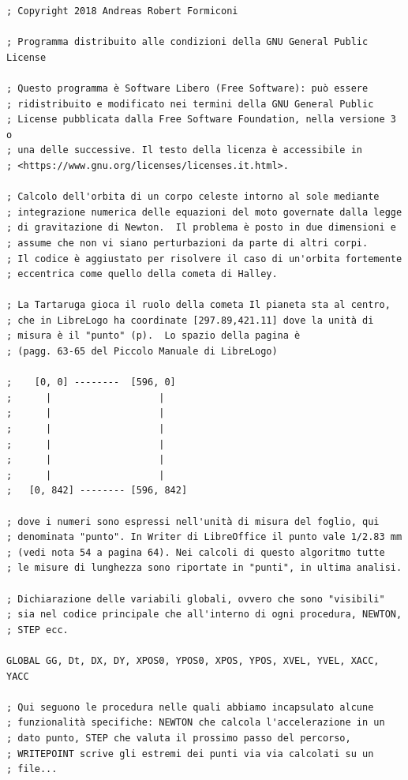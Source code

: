 \begin{lstlisting}[frame=single]  % Start your code-block
; Copyright 2018 Andreas Robert Formiconi

; Programma distribuito alle condizioni della GNU General Public License

; Questo programma è Software Libero (Free Software): può essere
; ridistribuito e modificato nei termini della GNU General Public 
; License pubblicata dalla Free Software Foundation, nella versione 3 o 
; una delle successive. Il testo della licenza è accessibile in 
; <https://www.gnu.org/licenses/licenses.it.html>.

; Calcolo dell'orbita di un corpo celeste intorno al sole mediante 
; integrazione numerica delle equazioni del moto governate dalla legge 
; di gravitazione di Newton.  Il problema è posto in due dimensioni e 
; assume che non vi siano perturbazioni da parte di altri corpi. 
; Il codice è aggiustato per risolvere il caso di un'orbita fortemente 
; eccentrica come quello della cometa di Halley.

; La Tartaruga gioca il ruolo della cometa Il pianeta sta al centro, 
; che in LibreLogo ha coordinate [297.89,421.11] dove la unità di 
; misura è il "punto" (p).  Lo spazio della pagina è 
; (pagg. 63-65 del Piccolo Manuale di LibreLogo)

;    [0, 0] --------  [596, 0]
;      |                   |
;      |                   |
;      |                   |
;      |                   |
;      |                   |
;      |                   |
;   [0, 842] -------- [596, 842]    

; dove i numeri sono espressi nell'unità di misura del foglio, qui 
; denominata "punto". In Writer di LibreOffice il punto vale 1/2.83 mm  
; (vedi nota 54 a pagina 64). Nei calcoli di questo algoritmo tutte 
; le misure di lunghezza sono riportate in "punti", in ultima analisi.
 
; Dichiarazione delle variabili globali, ovvero che sono "visibili" 
; sia nel codice principale che all'interno di ogni procedura, NEWTON, 
; STEP ecc.

GLOBAL GG, Dt, DX, DY, XPOS0, YPOS0, XPOS, YPOS, XVEL, YVEL, XACC, YACC 

; Qui seguono le procedura nelle quali abbiamo incapsulato alcune 
; funzionalità specifiche: NEWTON che calcola l'accelerazione in un 
; dato punto, STEP che valuta il prossimo passo del percorso, 
; WRITEPOINT scrive gli estremi dei punti via via calcolati su un 
; file...


\end{lstlisting}
